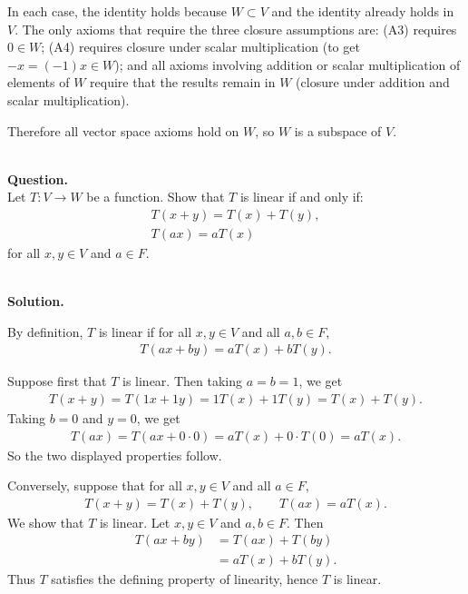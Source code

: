 \documentclass{article}
\begin{document}
\begin{mdframed}[linewidth=1pt]
In each case, the identity holds because $W \subset V$ and the identity already holds in $V$. The only axioms that require the three closure assumptions are: (A3) requires $0 \in W$; (A4) requires closure under scalar multiplication (to get $-x = (-1)x \in W$); and all axioms involving addition or scalar multiplication of elements of $W$ require that the results remain in $W$ (closure under addition and scalar multiplication).

Therefore all vector space axioms hold on $W$, so $W$ is a subspace of $V$.
\end{mdframed}

\bigskip


\hfill \break  $~\!\!$ \dotfill \medskip \\
\textbf{Question.}\\
Let $T: V \to W$ be a function. Show that $T$ is linear if and only if:
\begin{align*}
T(x+y) = T(x) + T(y), \\
T(ax) = aT(x)
\end{align*}
for all $x,y \in V$ and $a \in F$.

\noindent\\
\textbf{Solution.}
\begin{mdframed}[linewidth=1pt]
By definition, $T$ is linear if for all $x,y\in V$ and all $a,b\in F$,
\begin{align*}
T(ax+by)=aT(x)+bT(y).
\end{align*}

Suppose first that $T$ is linear. Then taking $a=b=1$, we get
\begin{align*}
T(x+y)=T(1x+1y)=1T(x)+1T(y)=T(x)+T(y).
\end{align*}
Taking $b=0$ and $y=0$, we get
\begin{align*}
T(ax)=T(ax+0\cdot 0)=aT(x)+0\cdot T(0)=aT(x).
\end{align*}
So the two displayed properties follow.

Conversely, suppose that for all $x,y\in V$ and all $a\in F$,
\begin{align*}
T(x+y)=T(x)+T(y),\qquad T(ax)=aT(x).
\end{align*}
We show that $T$ is linear. Let $x,y\in V$ and $a,b\in F$. Then
\begin{align*}
T(ax+by)
&=T(ax)+T(by) \\
&=aT(x)+bT(y).
\end{align*}
Thus $T$ satisfies the defining property of linearity, hence $T$ is linear.
\end{mdframed}
\end{document}
